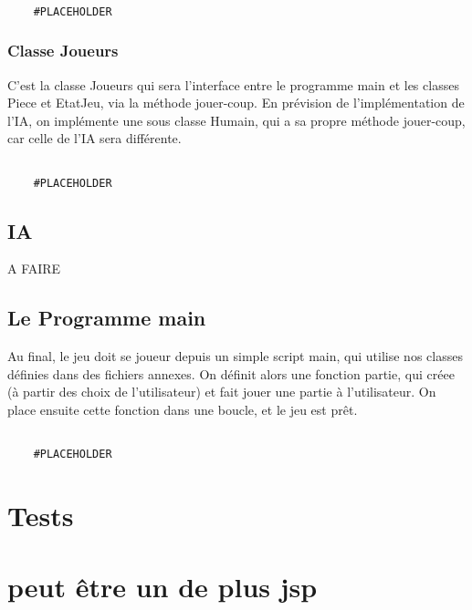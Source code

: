 \documentclass{article}
\begin{document}
\begin{verbatim}

    #PLACEHOLDER
\end{verbatim}

\subsubsection{Classe Joueurs}
C'est la classe Joueurs qui sera l'interface entre le programme main et les
classes Piece et EtatJeu, via la méthode jouer-coup. En prévision de l'implémentation de l'IA,
on implémente une sous classe Humain, qui a sa propre méthode jouer-coup, car celle de l'IA sera différente.

\begin{verbatim}

    #PLACEHOLDER
\end{verbatim}

\subsection{IA}
A FAIRE

\subsection{Le Programme main}
Au final, le jeu doit se joueur depuis un simple script main, qui utilise nos classes
définies dans des fichiers annexes.
On définit alors une fonction partie, qui créee (à partir des choix de l'utilisateur) et fait jouer une partie à l'utilisateur.
On place ensuite cette fonction dans une boucle, et le jeu est prêt.

\begin{verbatim}

    #PLACEHOLDER
\end{verbatim}

\section{Tests}
\section{peut être un de plus jsp}
\end{document}
